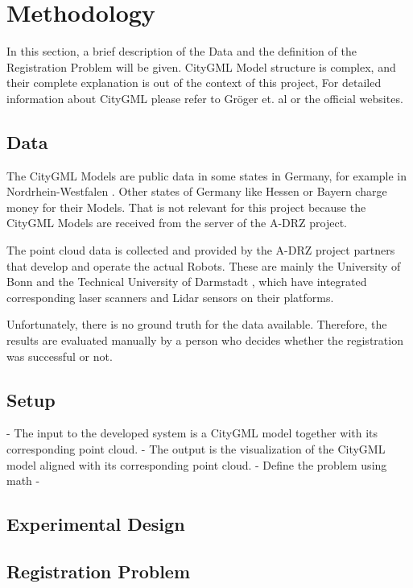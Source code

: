 

    \chapter{Methodology}

    In this section, a brief description of the Data and the definition of the Registration Problem will be given.
    CityGML Model structure is complex, and their complete explanation is out of the context of this project,
    For detailed information about CityGML please refer to Gröger et. al \cite{Groger_2012_OGC} or the official websites.

    \section{Data}
    The CityGML Models are public data in some states in Germany, for example in Nordrhein-Westfalen \cite{NRW3DModel_online}. 
    Other states of Germany like Hessen \cite{Hessen3DModel_online} or Bayern \cite{Bayern3DModel_online} charge money for their Models.
    That is not relevant for this project because the CityGML Models are received from the server of the A-DRZ project.

    The point cloud data is collected and provided by the A-DRZ project partners that develop and operate the actual Robots.
    These are mainly the University of Bonn \cite{UniBonn_online} and the Technical University of Darmstadt \cite{TUDarmstadt_online},
    which have integrated corresponding laser scanners and Lidar sensors on their platforms.    

    Unfortunately, there is no ground truth for the data available. Therefore, the results are evaluated manually by a person who decides whether the registration was successful or not.

    \section{Setup}
        - The input to the developed system is a CityGML model together with its corresponding point cloud.
        - The output is the visualization of the CityGML model aligned with its corresponding point cloud.
        - Define the problem using math
        -
    \section{Experimental Design}

    \section{Registration Problem}
        

